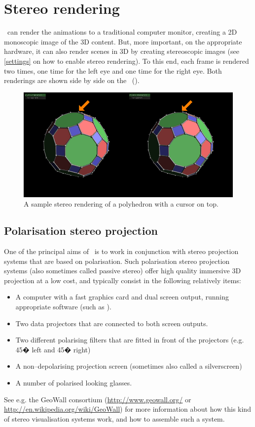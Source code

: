 \section{Stereo rendering \label{stereorendering}}
\softwarename\ can render the animations to a traditional computer monitor, creating a 2D monoscopic image of the 3D content. But, more important, on the appropriate hardware, it can also render scenes in 3D by creating stereoscopic images (see \ref{settings} on how to enable stereo rendering). To this end, each frame is rendered two times, one time for the left eye and one time for the right eye. Both renderings are shown side by side on the \renderwin\ ().

\begin{figure}
\includegraphics[scale=0.4]{bitmaps/stereosample.png}
\caption{A sample stereo rendering of a polyhedron with a cursor on top.}
\label{stereosample}
\end{figure}


\subsection{Polarisation stereo projection}
One of the principal aims of \softwarename\ is to work in conjunction with stereo projection systems that are based on polarisation. Such polarisation stereo projection systems (also sometimes called passive stereo) offer high quality immersive 3D projection at a low cost, and  typically consist in the following relatively items:
\begin{itemize}
\item A computer with a fast graphics card and dual screen output, running appropriate software (such as \softwarename).
\item Two data projectors that are connected to both screen outputs.
\item Two different polarising filters that are fitted in front of the projectors (e.g. 45� left and 45� right)
\item A non--depolarising projection screen (sometimes also called a silverscreen)
\item A number of polarised looking glasses.
\end{itemize}
See e.g. the GeoWall consortium (\url{http://www.geowall.org/} or \url{http://en.wikipedia.org/wiki/GeoWall}) for more information about how this kind of stereo visualisation systems work, and how to assemble such a system.

